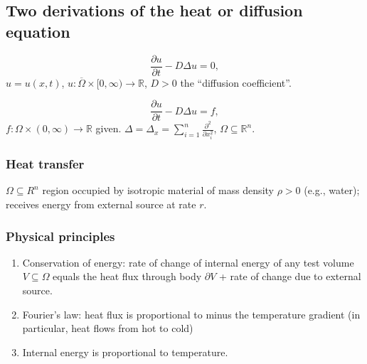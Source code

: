 \documentclass[12pt]{article}
\theoremstyle{definition}
\begin{document}

\subsection{Two derivations of the heat or diffusion equation}
\begin{equation}\tag{H}
\frac{\partial u}{\partial t}-D\Delta u=0,
\end{equation}
$u=u(x,t)$, $u:\overline\Omega\times[0,\infty)\rightarrow\mathbb R$, $D>0$ the ``diffusion coefficient''.

\begin{equation}\tag{IH}
\frac{\partial u}{\partial t}-D\Delta u=f,
\end{equation}
$f:\Omega\times(0,\infty)\rightarrow\mathbb R$ given. $\Delta=\Delta_x=\sum_{i=1}^n\frac{\partial^2}{\partial x_i^2}$, $\Omega\subseteq\mathbb R^n$.

\subsubsection*{Heat transfer}

$\Omega\subseteq R^n$ region occupied by isotropic material of mass density $\rho>0$ (e.g., water); receives energy from external source at rate $r$.

\subsubsection*{Physical principles}

\begin{enumerate}[label=(\arabic*)]
\item\label{conservation_energy} Conservation of energy: rate of change of internal energy of any test volume $V\subseteq\Omega$ equals the heat flux through body $\partial V$ + rate of change due to external source.

\item Fourier's law: heat flux is proportional to minus the temperature gradient (in particular, heat flows from hot to cold)

\item Internal energy is proportional to temperature.
\end{enumerate}
\end{document}
